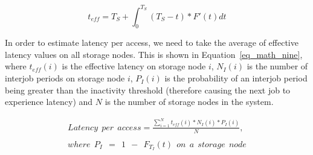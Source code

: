 \begin{equation}
\label{eq_math_eight}
t_{eff} = T_S + \int_{0}^{T_S} (T_S -
t) * F'(t) dt
\end{equation}
\hfill
 
In order to estimate latency per access, we need to take the average of
effective latency values on all storage nodes. This is shown in
Equation~\eqref{eq_math_nine}, where $t_{eff}(i)$
is the effective latency on storage node $i$, $N_I(i)$ is the number
of interjob periods on storage node $i$, $P_I(i)$ is the probability of an interjob period
being greater than the inactivity threshold (therefore causing the next job to
experience latency) and $N$ is the number of storage nodes in the system.

\begin{equation}
\begin{gathered}
Latency\ \ per\ \ access = \frac{\sum\limits_{i=1}^N t_{eff}(i) * N_I(i) * P_I(i)}{N},
\\
\\
where\ \ P_I\ \ =\ \ 1\ \ -\ \ F_{T_I}(t)\ \ on\ \ a\ \ storage\ \ node
\end{gathered}
\label{eq_math_nine}
\end{equation}
\hfill
